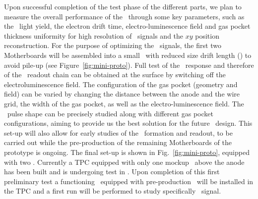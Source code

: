 Upon successful completion of the test phase of the different parts, we plan to measure the overall performance of the \DSps\ through some key parameters, such as the \SOne\ light yield, the electron drift time, electro-luminescence field and gas pocket thickness uniformity for high resolution of \STwo\ signals and the $x y$ position reconstruction. For the purpose of optimizing the \STwo\ signals, the first two Motherboards will be assembled into a small \TPC\ with reduced size drift length (\DSpZeroDriftLength) to avoid pile-up (see Figure~\ref{fig:mini-proto}). Full test of the \SOne\ response and therefore of the \SiPM\ readout chain can be obtained at the surface by switching off the electroluminescence field. The configuration of the gas pocket (geometry and field) can be varied by changing the distance between the anode and the wire grid, the width of the gas pocket, as well as the electro-luminescence field. The \STwo\ pulse shape can be precisely studied along with different gas pocket configurations, aiming to provide us the best solution for the future \LArTPC\ design.  This set-up will also allow for early studies of the \STwo\ formation and readout, to be carried out while the pre-production of the remaining Motherboards of the prototype is ongoing. The final set-up is shown in Fig.~\ref{fig:mini-proto}, equipped with two \DSkMBs. Currently a TPC equipped with only one mockup \DSkMB\ above the anode has been built and is undergoing test in \LAr. Upon completion of this first preliminary test a functioning \DSkMB\ equipped with pre-production \DSkPdms\ will be installed in the TPC and a first run will be performed to study specifically \STwo\ signal.

